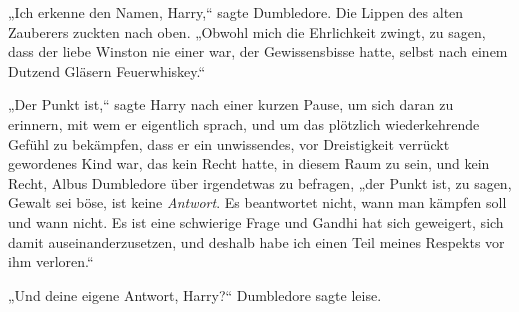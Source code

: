 „Ich erkenne den Namen, Harry,“ sagte Dumbledore. Die Lippen des alten Zauberers zuckten nach oben. „Obwohl mich die Ehrlichkeit zwingt, zu sagen, dass der liebe Winston nie einer war, der Gewissensbisse hatte, selbst nach einem Dutzend Gläsern Feuerwhiskey.“

„Der Punkt ist,“ sagte Harry nach einer kurzen Pause, um sich daran zu erinnern, mit wem er eigentlich sprach, und um das plötzlich wiederkehrende Gefühl zu bekämpfen, dass er ein unwissendes, vor Dreistigkeit verrückt gewordenes Kind war, das kein Recht hatte, in diesem Raum zu sein, und kein Recht, Albus Dumbledore über irgendetwas zu befragen, „der Punkt ist, zu sagen, Gewalt sei böse, ist keine \emph{Antwort}. Es beantwortet nicht, wann man kämpfen soll und wann nicht. Es ist eine schwierige Frage und Gandhi hat sich geweigert, sich damit auseinanderzusetzen, und deshalb habe ich einen Teil meines Respekts vor ihm verloren.“

„Und deine eigene Antwort, Harry?“ Dumbledore sagte leise.

